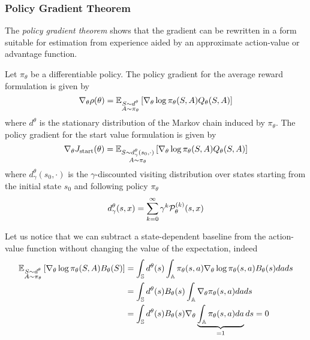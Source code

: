 \subsubsection{Policy Gradient Theorem}
The \emph{policy gradient theorem} \cite{sutton1999policy} shows that the gradient can be rewritten in a form suitable for estimation from experience aided by an approximate action-value or advantage function.
\begin{theorem}
\label{thm:risk_neutral_policy_gradient}
	Let $\pi_\theta$ be a differentiable policy. The policy gradient for the average reward formulation is given by
	\begin{equation}
		\nabla_\theta \rho(\theta) =
		\E[\substack{S \sim d^\theta\\A \sim \pi_\theta}]{\nabla_\theta\log
		\pi_\theta(S,A) Q_{\theta}(S, A)}
	\end{equation}
	where $d^\theta$ is the stationary distribution of the Markov chain induced by $\pi_\theta$. The policy gradient for the start value formulation is given by
	\begin{equation}
		\nabla_\theta J_{\text{start}}(\theta) =
		\E[\substack{S \sim d_\gamma^\theta(s_0, \cdot)\\A \sim \pi_\theta}]{\nabla_\theta\log
		\pi_\theta(S,A) Q_{\theta}(S, A)}
	\end{equation}
	where $d_\gamma^\theta(s_0, \cdot)$ is the $\gamma$-discounted visiting distribution over states starting from the initial state $s_0$ and following policy $\pi_\theta$
		\begin{equation}
			d_\gamma^\theta(s, x) = \sum_{k=0}^{\infty} \gamma^k \calP_\theta^{(k)}(s, x)
		\end{equation}
\end{theorem}
Let us notice that we can subtract a state-dependent baseline from the action-value function without changing the value of the expectation, indeed
\begin{equation*}
	\begin{split}
	\E[\substack{S \sim d^\theta\\A \sim \pi_\theta}]{\nabla_\theta\log
			\pi_\theta(S,A) B_\theta(S)} 
	&= \int_\S d^\theta(s) \int_\A \pi_\theta(s,a) \nabla_\theta\log
				\pi_\theta(s,a) B_\theta(s) da ds\\
	&= \int_\S d^\theta(s)  B_\theta(s) \int_\A \nabla_\theta \pi_\theta(s,a) da ds\\
	&= \int_\S d^\theta(s)  B_\theta(s)  \nabla_\theta  \underbrace{\int_\A  \pi_\theta(s,a) da}_{= 1} ds = 0
	\end{split}
\end{equation*}
